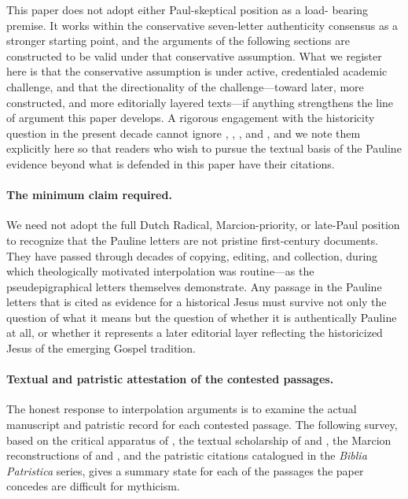 \documentclass[12pt,oneside]{article}
\begin{document}
This paper does not adopt either Paul-skeptical position as a load-
bearing premise.  It works within the conservative seven-letter
authenticity consensus as a stronger starting point, and the
arguments of the following sections are constructed to be valid under
that conservative assumption.  What we register here is that the
conservative assumption is under active, credentialed academic
challenge, and that the directionality of the challenge---toward later,
more constructed, and more editorially layered texts---if anything
strengthens the line of argument this paper develops.  A rigorous
engagement with the historicity question in the present decade cannot
ignore \citet{Vinzent2023}, \citet{Klinghardt2015}, \citet{BeDuhn2013},
and \citet{Livesey2024}, and we note them explicitly here so that
readers who wish to pursue the textual basis of the Pauline evidence
beyond what is defended in this paper have their citations.

\paragraph{The minimum claim required.}
We need not adopt the full Dutch Radical, Marcion-priority, or
late-Paul position to recognize that the Pauline letters are not
pristine first-century documents.  They have passed through decades
of copying, editing, and collection, during which theologically
motivated interpolation was routine---as the pseudepigraphical letters
themselves demonstrate.  Any passage in the Pauline letters that is
cited as evidence for a historical Jesus must survive not only the
question of what it means but the question of whether it is
authentically Pauline at all, or whether it represents a later
editorial layer reflecting the historicized Jesus of the emerging
Gospel tradition.

\paragraph{Textual and patristic attestation of the contested
passages.}
The honest response to interpolation arguments is to examine the
actual manuscript and patristic record for each contested passage.
The following survey, based on the critical apparatus of
\citet{NA28}, the textual scholarship of \citet{MetzgerEhrman2005}
and \citet{Zuntz1953}, the Marcion reconstructions of
\citet{BeDuhn2013} and \citet{Klinghardt2015}, and the patristic
citations catalogued in the \textit{Biblia Patristica} series,
gives a summary state for each of the passages the paper concedes
are difficult for mythicism.
\end{document}
